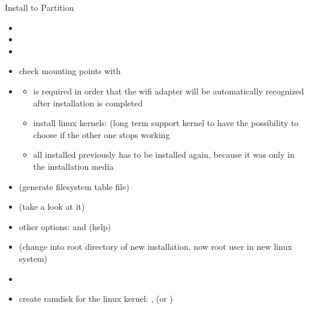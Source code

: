 \begin{frame}{Install to Partition\vspace{0.5cm}}
  \begin{itemize}
    \item {}
    \item {}
    \item {}
    \item check mounting points with 
    \item {}
      \begin{Sidenote}
        \begin{itemize}
          \scriptsize
          \item {} is required in order that the  wifi adapter will be automatically recognized after installation is completed
          \item install linux kernels:  (long term support kernel to have the possibility to choose if the other one stops working
          \item all installed previously has to be installed again, because it was only in the installation media
        \end{itemize}
      \end{Sidenote}
    \item {} (generate filesystem table file)
    \item {} (take a look at it)
      \item other options:  and  (help)
      \item {} (change into root directory of new installation, now root user in new linux system)
      \item {}
  \end{itemize}
  \begin{Sidenote}
    \begin{itemize}
      \scriptsize
      \item create ramdisk for the linux kernel: ,  (or )
    \end{itemize}
  \end{Sidenote}
\end{frame}


